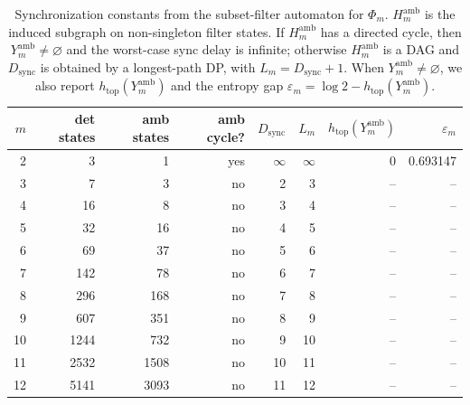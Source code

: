 \begin{table}[H]
\centering
\scriptsize
\setlength{\tabcolsep}{6pt}
\caption{Synchronization constants from the subset-filter automaton for $\Phi_m$. $H_m^{\mathrm{amb}}$ is the induced subgraph on non-singleton filter states. If $H_m^{\mathrm{amb}}$ has a directed cycle, then $Y_m^{\mathrm{amb}}\neq\varnothing$ and the worst-case sync delay is infinite; otherwise $H_m^{\mathrm{amb}}$ is a DAG and $D_{\mathrm{sync}}$ is obtained by a longest-path DP, with $L_m=D_{\mathrm{sync}}+1$. When $Y_m^{\mathrm{amb}}\neq\varnothing$, we also report $h_{\mathrm{top}}(Y_m^{\mathrm{amb}})$ and the entropy gap $\varepsilon_m=\log 2-h_{\mathrm{top}}(Y_m^{\mathrm{amb}})$.}
\label{tab:phi_m_sync_theory}
\begin{tabular}{r r r r r r r r}
\toprule
$m$ & det states & amb states & amb cycle? & $D_{\mathrm{sync}}$ & $L_m$ & $h_{\mathrm{top}}(Y_m^{\mathrm{amb}})$ & $\varepsilon_m$\\
\midrule
2 & 3 & 1 & yes & $\infty$ & $\infty$ & 0 & 0.693147\\
3 & 7 & 3 & no & 2 & 3 & -- & --\\
4 & 16 & 8 & no & 3 & 4 & -- & --\\
5 & 32 & 16 & no & 4 & 5 & -- & --\\
6 & 69 & 37 & no & 5 & 6 & -- & --\\
7 & 142 & 78 & no & 6 & 7 & -- & --\\
8 & 296 & 168 & no & 7 & 8 & -- & --\\
9 & 607 & 351 & no & 8 & 9 & -- & --\\
10 & 1244 & 732 & no & 9 & 10 & -- & --\\
11 & 2532 & 1508 & no & 10 & 11 & -- & --\\
12 & 5141 & 3093 & no & 11 & 12 & -- & --\\
\bottomrule
\end{tabular}
\end{table}
